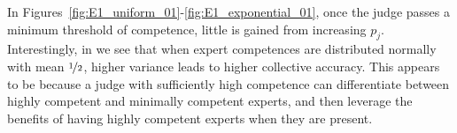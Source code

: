 \documentclass[letterpaper]{article} %
\newcommand{\ben}[1]{\textcolor{red}{Ben says: #1}}
\newcommand{\omer}[1]{\textcolor{purple}{Omer says: #1}}
\newcommand{\nick}[1]{\todo[color=kentuckyblue!40,size=footnotesize]{Nick says: #1}}
\newcommand{\nickin}[1]{\todo[color=kentuckyblue!40,inline]{Nick says: #1}}
\begin{document}
In Figures~\ref{fig:E1_uniform_01}-\ref{fig:E1_exponential_01}, once the judge passes a minimum threshold of competence, little is gained from increasing $p_j$. %
Interestingly, in  we see that when expert competences are distributed normally with mean $\nicefrac{1}{2}$, higher variance leads to higher collective accuracy. 
This appears to be because a judge with sufficiently high competence can differentiate between highly competent and minimally competent experts, and then leverage the benefits of having highly competent experts when they are present.
\end{document}

